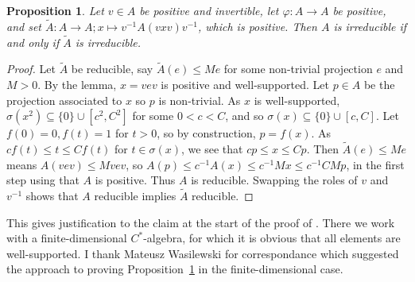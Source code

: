 \documentclass[twoside,a4paper,12pt]{article}
\theoremstyle{plain}
\newtheorem{proposition}{Proposition}[section]
\theoremstyle{definition}
\begin{document}
\begin{proposition}\label{prop:twisting_irred}
Let $v\in A$ be positive and invertible, let $\varphi\colon A\to A$ be positive, and set $\tilde A \colon A\to A; x \mapsto v^{-1} A(vxv) v^{-1}$, which is positive.  Then $A$ is irreducible if and only if $\tilde A$ is irreducible.
\end{proposition}
\begin{proof}
Let $\tilde A$ be reducible, say $\tilde A(e) \leq M e$ for some non-trivial projection $e$ and $M>0$.  By the lemma, $x=vev$ is positive and well-supported.  Let $p\in A$ be the projection associated to $x$ so $p$ is non-trivial.  As $x$ is well-supported, $\sigma(x^2) \subseteq \{0\} \cup [c^2,C^2]$ for some $0<c<C$, and so $\sigma(x) \subseteq \{0\} \cup [c,C]$.  Let $f(0)=0, f(t)=1$ for $t>0$, so by construction, $p = f(x)$.  As $cf(t) \leq t \leq Cf(t)$ for $t\in\sigma(x)$, we see that $c p \leq x \leq Cp$.  Then $\tilde A(e) \leq Me$ means $A(vev) \leq M vev$, so $A(p) \leq c^{-1} A(x) \leq c^{-1} M x \leq c^{-1}CM p$, in the first step using that $A$ is positive.  Thus $A$ is reducible.  Swapping the roles of $v$ and $v^{-1}$ shows that $A$ reducible implies $\tilde A$ reducible.
\end{proof}

This gives justification to the claim at the start of the proof of \cite[Proposition~4.3]{cgw}.  There we work with a finite-dimensional $C^*$-algebra, for which it is obvious that all elements are well-supported.  I thank Mateusz Wasilewski for correspondance which suggested the approach to proving Proposition~\ref{prop:twisting_irred} in the finite-dimensional case.
\end{document}
